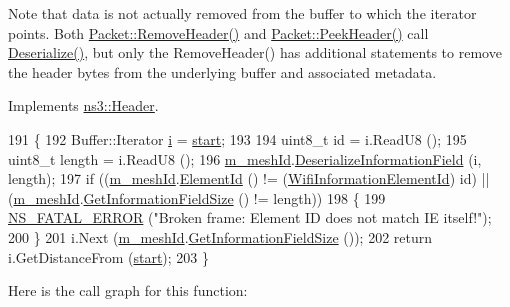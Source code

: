 Note that data is not actually removed from the buffer to which the iterator points. Both \hyperlink{classns3_1_1Packet_a0961eccf975d75f902d40956c93ba63e}{Packet\+::\+Remove\+Header()} and \hyperlink{classns3_1_1Packet_aadc63487bea70945c418f4c3e9b81964}{Packet\+::\+Peek\+Header()} call \hyperlink{classns3_1_1dot11s_1_1PeerLinkCloseStart_a0c21315898d9ed65222223b4b8a4039d}{Deserialize()}, but only the Remove\+Header() has additional statements to remove the header bytes from the underlying buffer and associated metadata. 

Implements \hyperlink{classns3_1_1Header_a78be9400bb66b2a8543606f395ef5396}{ns3\+::\+Header}.


\begin{DoxyCode}
191 \{
192   Buffer::Iterator \hyperlink{bernuolliDistribution_8m_a6f6ccfcf58b31cb6412107d9d5281426}{i} = \hyperlink{namespacevisualizer_1_1core_a2a35e5d8a34af358b508dac8635754e0}{start};
193   
194   uint8\_t \textcolor{keywordtype}{id} = i.ReadU8 ();
195   uint8\_t length = i.ReadU8 ();
196   \hyperlink{classns3_1_1dot11s_1_1PeerLinkCloseStart_ac417fdd4c8940d78be460da53937ee55}{m\_meshId}.\hyperlink{classns3_1_1dot11s_1_1IeMeshId_aeffabe32bf155a57c71ff0e3132e32cc}{DeserializeInformationField} (i, length);
197   \textcolor{keywordflow}{if} ((\hyperlink{classns3_1_1dot11s_1_1PeerLinkCloseStart_ac417fdd4c8940d78be460da53937ee55}{m\_meshId}.\hyperlink{classns3_1_1dot11s_1_1IeMeshId_a828cbcbed6a9a1303cfb716142ae994d}{ElementId} () != (\hyperlink{namespacens3_aeb185e0c8a60816016bca079f1420478}{WifiInformationElementId}) \textcolor{keywordtype}{id}) || 
      (\hyperlink{classns3_1_1dot11s_1_1PeerLinkCloseStart_ac417fdd4c8940d78be460da53937ee55}{m\_meshId}.\hyperlink{classns3_1_1dot11s_1_1IeMeshId_a8c6820036a7f5e86d88737c7c2e6f4d6}{GetInformationFieldSize} () != length))
198     \{
199       \hyperlink{group__fatal_ga5131d5e3f75d7d4cbfd706ac456fdc85}{NS\_FATAL\_ERROR} (\textcolor{stringliteral}{"Broken frame: Element ID does not match IE itself!"});
200     \}
201   i.Next (\hyperlink{classns3_1_1dot11s_1_1PeerLinkCloseStart_ac417fdd4c8940d78be460da53937ee55}{m\_meshId}.\hyperlink{classns3_1_1dot11s_1_1IeMeshId_a8c6820036a7f5e86d88737c7c2e6f4d6}{GetInformationFieldSize} ());
202   \textcolor{keywordflow}{return} i.GetDistanceFrom (\hyperlink{namespacevisualizer_1_1core_a2a35e5d8a34af358b508dac8635754e0}{start});
203 \}
\end{DoxyCode}


Here is the call graph for this function\+:


